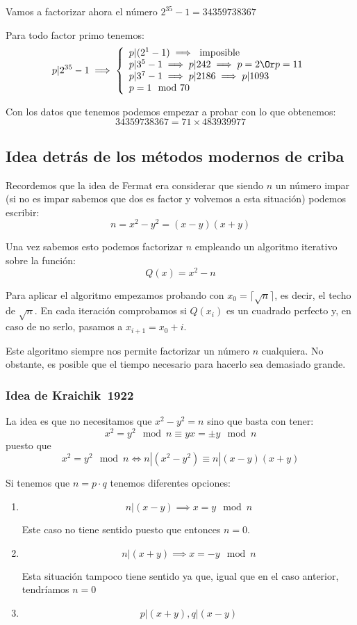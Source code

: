 \begin{example}
Vamos a factorizar ahora el número $2^{35}-1=34359738367$

Para todo factor primo tenemos:
\[p|2^{35}-1 \implies \left\{ \begin{array}{l}p|(2^1-1)\implies \text{ imposible}\\
p|3^5-1 \implies p|242 \implies p=2 \Or p=11\\
p|3^7-1 \implies p |2186 \implies  p|1093\\
p =1 \mod 70 \end{array}\right.\]

Con los datos que tenemos podemos empezar a probar con lo que obtenemos:
\[34359738367 = 71 \times 483939977\]
\end{example}

\subsection{Idea detrás de los métodos modernos de criba}

Recordemos que la idea de Fermat era considerar que siendo $n$ un número impar (si no es impar sabemos que dos es factor y volvemos a esta situación) podemos escribir:
\[n = x^2-y^2 = (x-y)(x+y)\]

Una vez sabemos esto podemos factorizar $n$ empleando un algoritmo iterativo sobre la función:
\[Q(x) = x^2 - n\]

Para aplicar el algoritmo empezamos probando con $x_0 = \lceil\sqrt{n}\rceil$, es decir, el techo de $\sqrt{n}$. En cada iteración comprobamos si $Q(x_i)$ es un cuadrado perfecto y, en caso de no serlo, pasamos a $x_{i+1}=x_0+i$.

Este algoritmo siempre nos permite factorizar un número $n$ cualquiera. No obstante, es posible que el tiempo necesario para hacerlo sea demasiado grande.

\subsubsection{Idea de Kraichik~1922}
La idea es que no necesitamos que $x^2-y^2 =n$ sino que basta con tener:
\[x^2 = y^2 \mod n \equiv yx = \pm y \mod n\]
puesto que
\[x^2 = y^2 \mod n \iff n|(x^2-y^2) \equiv n|(x-y)(x+y)\]

Si tenemos que $n=p\cdot q$ tenemos diferentes opciones:
\begin{enumerate}
\item
\[n|(x-y) \implies x=y \mod n\]

Este caso no tiene sentido puesto que entonces $n=0$.

\item
\[n|(x+y) \implies x=-y \mod n\]

Esta situación tampoco tiene sentido ya que, igual que en el caso anterior, tendríamos $n=0$

\item
\[p|(x+y), q|(x-y)\]
\end{enumerate}

